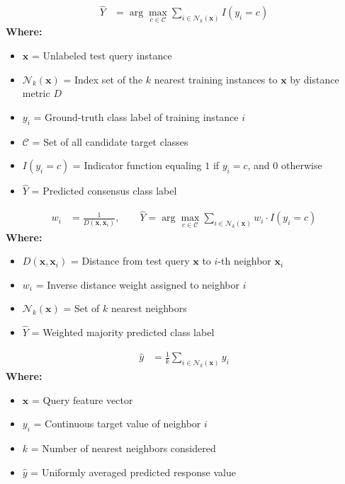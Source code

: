 \begin{formulabox}
\begin{align*}
    \hat{Y} &= \arg\max_{c \in \mathcal{C}} \sum_{i \in \mathcal{N}_k(\mathbf{x})} I(y_i = c)
\end{align*}
\textbf{Where:}
\begin{itemize}[noitemsep, topsep=1pt]
    \item $\mathbf{x}$ = Unlabeled test query instance
    \item $\mathcal{N}_k(\mathbf{x})$ = Index set of the $k$ nearest training instances to $\mathbf{x}$ by distance metric $D$
    \item $y_i$ = Ground-truth class label of training instance $i$
    \item $\mathcal{C}$ = Set of all candidate target classes
    \item $I(y_i = c)$ = Indicator function equaling $1$ if $y_i = c$, and $0$ otherwise
    \item $\hat{Y}$ = Predicted consensus class label
\end{itemize}
\end{formulabox}

\begin{formulabox}
\begin{align*}
    w_i &= \frac{1}{D(\mathbf{x}, \mathbf{x}_i)}, \qquad \hat{Y} = \arg\max_{c \in \mathcal{C}} \sum_{i \in \mathcal{N}_k(\mathbf{x})} w_i \cdot I(y_i = c)
\end{align*}
\textbf{Where:}
\begin{itemize}[noitemsep, topsep=1pt]
    \item $D(\mathbf{x}, \mathbf{x}_i)$ = Distance from test query $\mathbf{x}$ to $i$-th neighbor $\mathbf{x}_i$
    \item $w_i$ = Inverse distance weight assigned to neighbor $i$
    \item $\mathcal{N}_k(\mathbf{x})$ = Set of $k$ nearest neighbors
    \item $\hat{Y}$ = Weighted majority predicted class label
\end{itemize}
\end{formulabox}

\begin{formulabox}
\begin{align*}
    \hat{y} &= \frac{1}{k} \sum_{i \in \mathcal{N}_k(\mathbf{x})} y_i
\end{align*}
\textbf{Where:}
\begin{itemize}[noitemsep, topsep=1pt]
    \item $\mathbf{x}$ = Query feature vector
    \item $y_i$ = Continuous target value of neighbor $i$
    \item $k$ = Number of nearest neighbors considered
    \item $\hat{y}$ = Uniformly averaged predicted response value
\end{itemize}
\end{formulabox}


